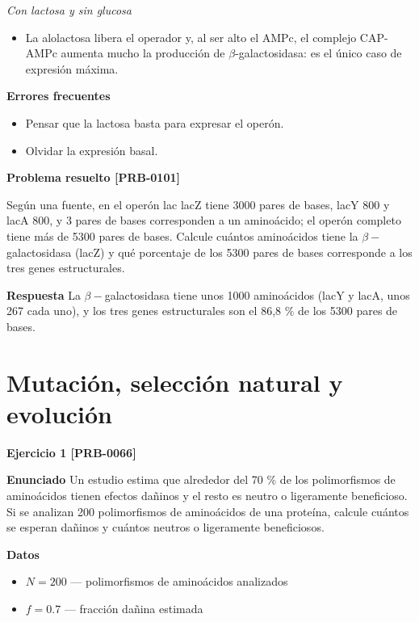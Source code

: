\documentclass{book}
\begin{document}
\noindent\textit{Con lactosa y sin glucosa}
\begin{itemize}
\item La alolactosa libera el operador y, al ser alto el AMPc, el complejo CAP-AMPc aumenta mucho la producción de \(\beta\)-galactosidasa: es el único caso de expresión máxima.
\end{itemize}

\noindent\textbf{Errores frecuentes}
\begin{itemize}
\item Pensar que la lactosa basta para expresar el operón.
\item Olvidar la expresión basal.
\end{itemize}

\noindent\textbf{Problema resuelto [PRB-0101]}

Según una fuente, en el operón lac lacZ tiene 3000 pares de bases, lacY 800 y lacA 800, y 3 pares de bases corresponden a un aminoácido; el operón completo tiene más de 5300 pares de bases. Calcule cuántos aminoácidos tiene la \(\beta-\)galactosidasa (lacZ) y qué porcentaje de los 5300 pares de bases corresponde a los tres genes estructurales.


\noindent\textbf{Respuesta}
La \(\beta-\)galactosidasa tiene unos 1000 aminoácidos (lacY y lacA, unos 267 cada uno), y los tres genes estructurales son el 86,8 \% de los 5300 pares de bases.


\section{Mutación, selección natural y evolución}

\noindent\textbf{Ejercicio 1 [PRB-0066]}

\noindent\textbf{Enunciado}
Un estudio estima que alrededor del 70 \% de los polimorfismos de aminoácidos tienen efectos dañinos y el resto es neutro o ligeramente beneficioso. Si se analizan 200 polimorfismos de aminoácidos de una proteína, calcule cuántos se esperan dañinos y cuántos neutros o ligeramente beneficiosos.


\noindent\textbf{Datos}
\begin{itemize}
\item $N = 200$ — polimorfismos de aminoácidos analizados
\item $f = 0.7$ — fracción dañina estimada
\end{itemize}
\end{document}
